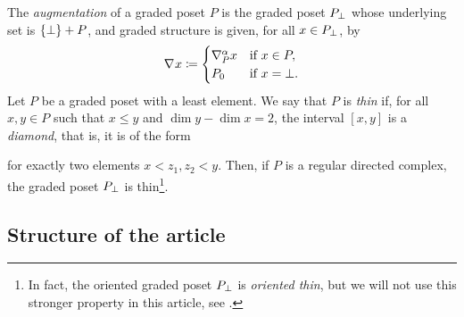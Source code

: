 The \emph{augmentation} of a graded poset \( P \) is the graded poset \( \augm{P} \) whose underlying set is \( \set{\bot} + P \), and graded structure is given, for all \( x \in \augm{P} \), by
\begin{equation*}
    \cofaces{}{} x \eqdef
    \begin{cases}
        \cofaces{P}{\a} x &\text{if } x \in P,\\
        \gr{0}{P}         &\text{if } x = \bot.
    \end{cases}
\end{equation*}
Let \( P \) be a graded poset with a least element.
We say that \( P \) is \emph{thin} if, for all \( x, y \in P \) such that \( x \le y \) and \( \dim y - \dim x = 2 \), the interval \( [x, y] \) is a \emph{diamond}, that is, it is of the form 
\begin{center}
\end{center}
for exactly two elements \( x < z_1, z_2 < y \).
Then, if \( P \) is a regular directed complex, the graded poset \( \augm{P} \) is thin\footnote{In fact, the oriented graded poset \( \augm{P} \) is \emph{oriented thin}, but we will not use this stronger property in this article, see \cite[2.3.10]{hadzihasanovic2024combinatorics}.}.

\subsection*{Structure of the article}


